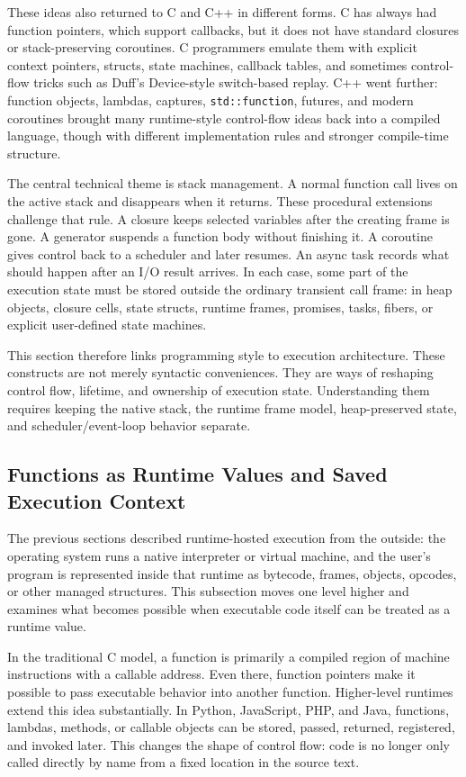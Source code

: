 \documentclass[a4paper,twoside]{report}
\begin{document}
These ideas also returned to C and C++ in different forms. C has always had function pointers, which support callbacks, but it does not have standard closures or stack-preserving coroutines. C programmers emulate them with explicit context pointers, structs, state machines, callback tables, and sometimes control-flow tricks such as Duff's Device-style switch-based replay. C++ went further: function objects, lambdas, captures, \texttt{std::function}, futures, and modern coroutines brought many runtime-style control-flow ideas back into a compiled language, though with different implementation rules and stronger compile-time structure.

The central technical theme is stack management. A normal function call lives on the active stack and disappears when it returns. These procedural extensions challenge that rule. A closure keeps selected variables after the creating frame is gone. A generator suspends a function body without finishing it. A coroutine gives control back to a scheduler and later resumes. An async task records what should happen after an I/O result arrives. In each case, some part of the execution state must be stored outside the ordinary transient call frame: in heap objects, closure cells, state structs, runtime frames, promises, tasks, fibers, or explicit user-defined state machines.

This section therefore links programming style to execution architecture. These constructs are not merely syntactic conveniences. They are ways of reshaping control flow, lifetime, and ownership of execution state. Understanding them requires keeping the native stack, the runtime frame model, heap-preserved state, and scheduler/event-loop behavior separate.

\subsection{Functions as Runtime Values and Saved Execution Context}

The previous sections described runtime-hosted execution from the outside: the operating system runs a native interpreter or virtual machine, and the user's program is represented inside that runtime as bytecode, frames, objects, opcodes, or other managed structures. This subsection moves one level higher and examines what becomes possible when executable code itself can be treated as a runtime value.

In the traditional C model, a function is primarily a compiled region of machine instructions with a callable address. Even there, function pointers make it possible to pass executable behavior into another function. Higher-level runtimes extend this idea substantially. In Python, JavaScript, PHP, and Java, functions, lambdas, methods, or callable objects can be stored, passed, returned, registered, and invoked later. This changes the shape of control flow: code is no longer only called directly by name from a fixed location in the source text.
\end{document}
